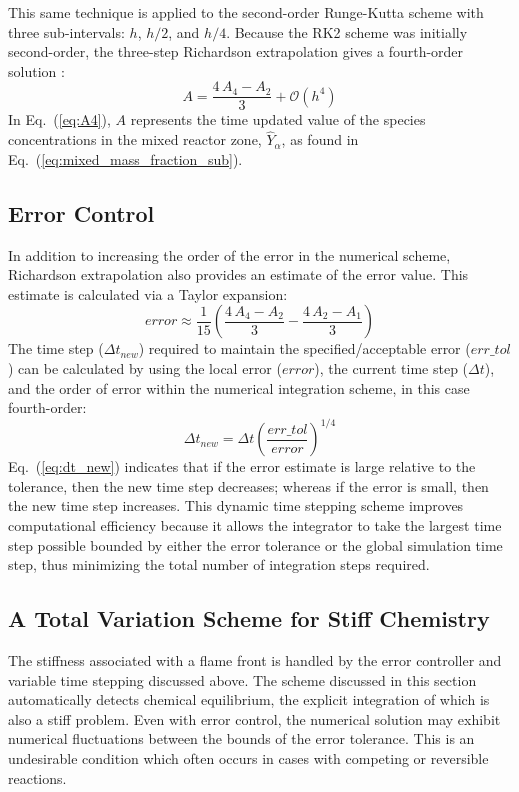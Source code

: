 This same technique is applied to the second-order Runge-Kutta scheme with three sub-intervals: $h$, $h/2$, and $h/4$. Because the
RK2 scheme was initially second-order, the three-step Richardson extrapolation gives a fourth-order solution \cite{Moin:2001}:
\begin{equation}\label{eq:A4}
A=\frac{4\,A_4-A_2}{3}  + \mathcal{O}(h^4)
\end{equation}
In Eq.~(\ref{eq:A4}), $A$ represents the time updated value of the species concentrations in the mixed reactor zone,
$\hat{Y}_{\alpha}$, as found in Eq.~(\ref{eq:mixed_mass_fraction_sub}).

\subsection*{Error Control}

In addition to increasing the order of the error in the numerical scheme, Richardson extrapolation also provides an estimate of
the error value. This estimate is calculated via a Taylor expansion:
\begin{equation}\label{eq:error}
error \approx \frac{1}{15}\left(\frac{4\,A_4-A_2}{3} - \frac{4\,A_2-A_1}{3}\right)
\end{equation}
The time step ($\Delta t_{new}$) required to maintain the specified/acceptable error ($err\_tol$) can be calculated by using the
local error ($error$), the current time step ($\Delta t$), and the order of error within the numerical integration scheme, in this
case fourth-order:
\begin{equation}\label{eq:dt_new}
\Delta t_{new}=\Delta t \left(\frac{err\_tol}{error}\right)^{1/4}
\end{equation}
Eq.~(\ref{eq:dt_new}) indicates that if the error estimate is large relative to the tolerance, then the new time step decreases;
whereas if the error is small, then the new time step increases. This dynamic time stepping scheme improves computational
efficiency because it allows the integrator to take the largest time step possible bounded by either the error tolerance or the
global simulation time step, thus minimizing the total number of integration steps required.

\subsection*{A Total Variation Scheme for Stiff Chemistry}

The stiffness associated with a flame front is handled by the error controller and variable time stepping discussed above. The
scheme discussed in this section automatically detects chemical equilibrium, the explicit integration of which is also a stiff
problem.  Even with error control, the numerical solution may exhibit numerical fluctuations between the bounds of the error
tolerance.  This is an undesirable condition which often occurs in cases with competing or reversible reactions.

